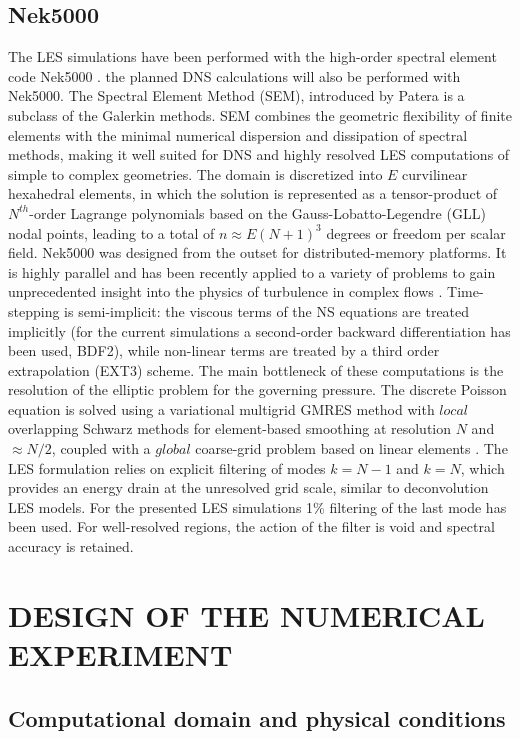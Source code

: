 \documentclass[11pt,letterpaper,english]{article}
\begin{document}
\subsection{Nek5000}
The LES simulations have been performed with the high-order spectral element code Nek5000 \cite{fischer2002}. the planned DNS calculations will also be performed with Nek5000. The Spectral Element Method (SEM), introduced by Patera \cite{patera1984} is a subclass of the Galerkin methods. SEM combines the geometric flexibility of finite elements with the minimal numerical dispersion and dissipation of spectral methods, making it well suited for DNS and highly resolved LES computations of simple to complex geometries. The domain is discretized into $E$ curvilinear hexahedral elements, in which the solution is represented as a tensor-product of $N^{th}$-order Lagrange polynomials based on the Gauss-Lobatto-Legendre (GLL) nodal points, leading to a total of $n\approx E (N+1)^3$ degrees or freedom per scalar field. Nek5000 was designed from the outset for distributed-memory platforms. It is highly parallel and has been recently applied to a variety of problems to gain unprecedented insight into the physics of turbulence in complex flows \cite{obabko2015}. Time-stepping is semi-implicit: the viscous terms of the NS equations are treated implicitly (for the current simulations a second-order backward differentiation has been used,  BDF2), while non-linear terms are treated by a third order extrapolation (EXT3) scheme. The main bottleneck of these computations is the resolution of the elliptic problem for the governing pressure. The discrete Poisson equation is solved using a variational multigrid GMRES method with $local$ overlapping Schwarz methods for element-based smoothing at resolution $N$ and $\approx N/2$, coupled with a $global$ coarse-grid problem based on linear elements \cite{fischer2005}. The LES formulation relies on explicit filtering \cite{slotz2005} of modes $k=N-1$ and $k=N$, which provides an energy drain at the unresolved grid scale, similar to deconvolution LES models. For the presented LES simulations 1\% filtering of the last mode has been used. For well-resolved regions, the action of the filter is void and spectral accuracy is retained.

\section{DESIGN OF THE NUMERICAL EXPERIMENT}
\label{results_saturne}

\subsection{Computational domain and physical conditions}
\end{document}
